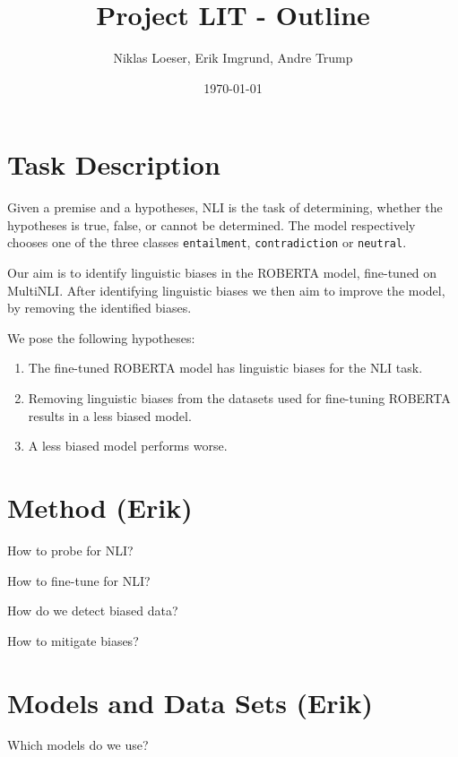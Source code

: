 \documentclass[12pt,a4paper]{article}
\title{Project LIT - Outline}
\author{Niklas Loeser, Erik Imgrund, Andre Trump}
\date{\today}
\begin{document}
\begin{acronym}
\end{acronym}

\maketitle

\section{Task Description}
Given a premise and a hypotheses, \ac{NLI} is the task of determining, whether the hypotheses is true, false, or cannot be determined. The model respectively chooses one of the three classes \texttt{entailment}, \texttt{contradiction} or \texttt{neutral}.

Our aim is to identify linguistic biases in the ROBERTA model, fine-tuned on MultiNLI. After identifying linguistic biases we then aim to improve the model, by removing the identified biases.

We pose the following hypotheses:
\begin{enumerate}
  \item The fine-tuned ROBERTA model has linguistic biases for the \ac{NLI} task.
  \item Removing linguistic biases from the datasets used for fine-tuning ROBERTA results in a less biased model.
  \item A less biased model performs worse. %
\end{enumerate}

\section{Method (Erik)}
How to probe for NLI?

How to fine-tune for NLI?

How do we detect biased data?

How to mitigate biases?

\section{Models and Data Sets (Erik)}
Which models do we use?
\end{document}

